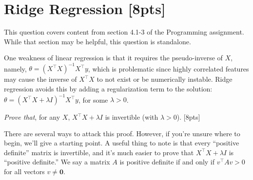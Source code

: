 \section{Ridge Regression [8pts]}
This question covers content from section 4.1-3 of the Programming assignment. While that section may be helpful, this question is standalone.

\bigskip One weakness of linear regression is that it requires the pseudo-inverse of $X$, namely, $\theta=(X^\top X)^{-1}X^\top y$, which is problematic since highly correlated features may cause the inverse of $X^\top X$ to not exist or be numerically instable. Ridge regression avoids this by adding a regularization term to the solution: $\theta=(X^\top X+\lambda I)^{-1}X^\top y$, for some $\lambda>0$.

\smallskip \emph{Prove that}, for any $X$, $X^\top X+\lambda I$ is invertible (with $\lambda>0$). [8pts]

\begin{hintbox}
    There are several ways to attack this proof. However, if you're unsure where to begin, we'll give a starting point. A useful thing to note is that every ``positive definite'' matrix is invertible, and it's much easier to prove that $X^\top X+\lambda I$ is ``positive definite.'' We say a matrix $A$ is positive definite if and only if $v^\top Av > 0$ for all vectors $v\neq \boldsymbol{0}$.
\end{hintbox}
